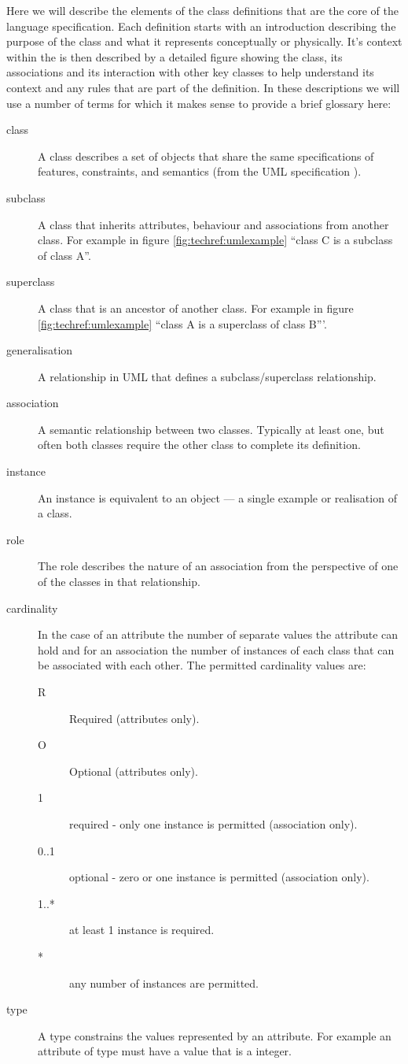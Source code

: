 Here we will describe the elements of the class definitions that are
the core of the language specification. Each definition starts with an
introduction describing the purpose of the class and what it
represents conceptually or physically. It's context within the \PDl is then described by a detailed figure showing the class, its
associations and its interaction with other key classes to help
understand its context and any rules that are part of the
definition. In these descriptions we will use a number of terms for
which it makes sense to provide a brief glossary here:
\begin{description}
\item[class] A class describes a set of objects that share the same
  specifications of features, constraints, and semantics (from the UML
  specification \cite{umlspec}).
\item[subclass] A class that inherits attributes, behaviour and
  associations from another class. For example in figure
  \ref{fig:techref:umlexample} ``class C is a subclass of class A''.
\item[superclass] A class that is an ancestor of another class. For
  example in figure \ref{fig:techref:umlexample} ``class A is a superclass of class B'''.
\item[generalisation] A relationship in UML that defines a
  subclass/superclass relationship.
\item[association] A semantic relationship between two
  classes. Typically at least one, but often both classes require the
  other class to complete its definition.
\item[instance] An instance is equivalent to an object --- a single
  example or realisation of a class.
\item[role] The role describes the nature of an association from the
  perspective of one of the classes in that relationship.
\item[cardinality] In the case of an attribute the number of separate
  values the attribute can hold and for an association the number of
  instances of each class that can be associated with each other. The
  permitted cardinality values are:
  \begin{description}
  \item[R] Required (attributes only).
  \item[O] Optional (attributes only).
  \item[1] required - only one instance is permitted (association only).
  \item[0..1] optional -  zero or one instance is permitted (association only).
  \item[1..*] at least 1 instance is required.
  \item[*] any number of instances are permitted.
  \end{description}
\item[type] A type constrains the values represented by an
  attribute. For example an attribute of type  must have a
  value that is a integer.
\end{description}
